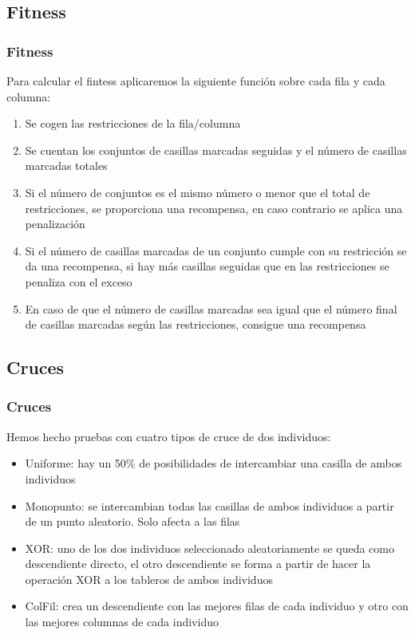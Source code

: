\documentclass{beamer}
\begin{document}
\subsection{Fitness}

\begin{frame}
    \frametitle{Fitness}

    Para calcular el fintess aplicaremos la siguiente función sobre cada fila y cada columna:
    \begin{enumerate}
        \item <1-> Se cogen las restricciones de la fila/columna
        \item <2-> Se cuentan los conjuntos de casillas marcadas seguidas y el número de casillas marcadas totales
        \item <3-> Si el número de conjuntos es el mismo número o menor que el total de restricciones, se proporciona una recompensa, en caso contrario se aplica una penalización
        \item <4-> Si el número de casillas marcadas de un conjunto cumple con su restricción se da una recompensa, si hay más casillas seguidas que en las restricciones se penaliza con el exceso
        \item <5-> En caso de que el número de casillas marcadas sea igual que el número final de casillas marcadas según las restricciones, consigue una recompensa
    \end{enumerate}
\end{frame}
\subsection{Cruces}
\begin{frame}
    \frametitle{Cruces}
    Hemos hecho pruebas con cuatro tipos de cruce de dos individuos:
    \begin{itemize}
        \item <1-> Uniforme: hay un 50\% de posibilidades de intercambiar una casilla de ambos individuos
        \item <2-> Monopunto: se intercambian todas las casillas de ambos individuos a partir de un punto aleatorio. Solo afecta a las filas
        \item <3-> XOR: uno de los dos individuos seleccionado aleatoriamente se queda como descendiente directo, el otro descendiente se forma a partir de hacer la operación XOR a los tableros de ambos individuos
        \item <4-> ColFil: crea un descendiente con las mejores filas de cada individuo y otro con las mejores columnas de cada individuo
    \end{itemize}
\end{frame}
\end{document}
